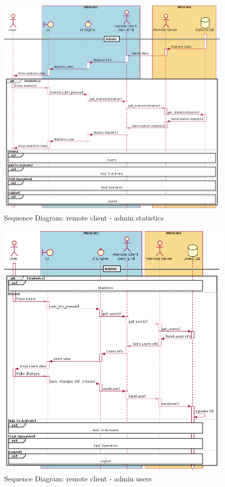 \begin{figure}[htb!]
\centering
    \includegraphics[width=1\columnwidth]{./img/seq-rc-admin-statistics.png}
  \caption{Sequence Diagram: remote client - admin statistics}%
\label{fig:seq-rc-admin-statistics}
\end{figure}

\begin{figure}[htb!]
\centering
    \includegraphics[width=1\columnwidth]{./img/seq-rc-admin-users.png}
  \caption{Sequence Diagram: remote client - admin users}%
\label{fig:seq-rc-admin-users}
\end{figure}

